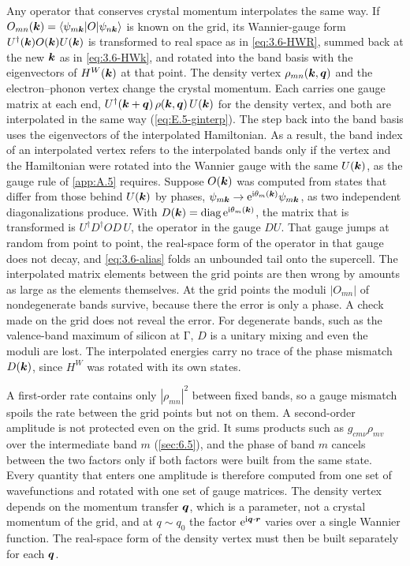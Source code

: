 Any operator that conserves crystal momentum interpolates the same way. If $O_{mn}(\bm{k}) = \langle\psi_{m\bm{k}}|O|\psi_{n\bm{k}}\rangle$ is known on the grid, its Wannier-gauge form $U^\dagger(\bm{k})O(\bm{k})U(\bm{k})$ is transformed to real space as in \cref{eq:3.6-HWR}, summed back at the new $\bm{k}$ as in \cref{eq:3.6-HWk}, and rotated into the band basis with the eigenvectors of $H^W(\bm{k})$ at that point. The density vertex $\rho_{mn}(\bm{k},\bm{q})$ and the electron--phonon vertex change the crystal momentum. Each carries one gauge matrix at each end, $U^\dagger(\bm{k} + \bm{q})\,\rho(\bm{k},\bm{q})\,U(\bm{k})$ for the density vertex, and both are interpolated in the same way (\cref{eq:E.5-ginterp}). The step back into the band basis uses the eigenvectors of the interpolated Hamiltonian. As a result, the band index of an interpolated vertex refers to the interpolated bands only if the vertex and the Hamiltonian were rotated into the Wannier gauge with the same $U(\bm{k})$, as the gauge rule of \cref{app:A.5} requires. Suppose $O(\bm{k})$ was computed from states that differ from those behind $U(\bm{k})$ by phases, $\psi_{m\bm{k}} \to \mathrm{e}^{\mathrm{i}\theta_m(\bm{k})}\psi_{m\bm{k}}$, as two independent diagonalizations produce. With $D(\bm{k}) = \mathrm{diag}\,\mathrm{e}^{\mathrm{i}\theta_m(\bm{k})}$, the matrix that is transformed is $U^\dagger D^\dagger OD\,U$, the operator in the gauge $DU$. That gauge jumps at random from point to point, the real-space form of the operator in that gauge does not decay, and \cref{eq:3.6-alias} folds an unbounded tail onto the supercell. The interpolated matrix elements between the grid points are then wrong by amounts as large as the elements themselves. At the grid points the moduli $|O_{mn}|$ of nondegenerate bands survive, because there the error is only a phase. A check made on the grid does not reveal the error. For degenerate bands, such as the valence-band maximum of silicon at $\mathrm{\Gamma}$, $D$ is a unitary mixing and even the moduli are lost. The interpolated energies carry no trace of the phase mismatch $D(\bm{k})$, since $H^W$ was rotated with its own states.

A first-order rate contains only $|\rho_{mn}|^2$ between fixed bands, so a gauge mismatch spoils the rate between the grid points but not on them. A second-order amplitude is not protected even on the grid. It sums products such as $g_{cm\nu}\rho_{mv}$ over the intermediate band $m$ (\cref{sec:6.5}), and the phase of band $m$ cancels between the two factors only if both factors were built from the same state. Every quantity that enters one amplitude is therefore computed from one set of wavefunctions and rotated with one set of gauge matrices. The density vertex depends on the momentum transfer $\bm{q}$, which is a parameter, not a crystal momentum of the grid, and at $q \sim q_0$ the factor $\mathrm{e}^{\mathrm{i}\bm{q}\cdot\bm{r}}$ varies over a single Wannier function. The real-space form of the density vertex must then be built separately for each $\bm{q}$.

